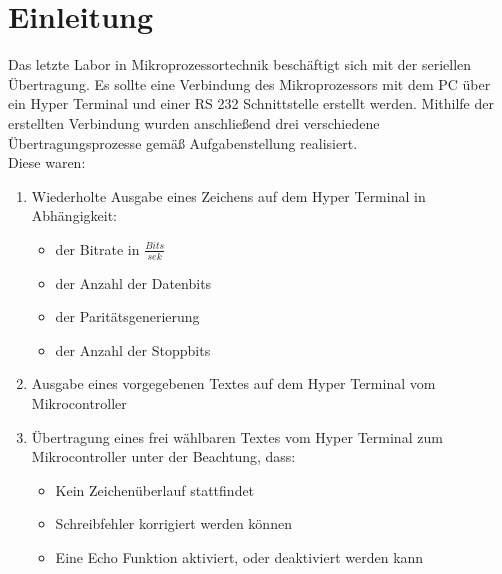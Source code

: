 %
%





\setlength{\parindent}{0pt}




\newpage
\listoftables
\listoffigures
\lstlistoflistings

\newpage

\tableofcontents
\newpage

	\section{Einleitung}
	
	Das letzte Labor in Mikroprozessortechnik beschäftigt sich mit der seriellen Übertragung. Es sollte eine Verbindung des Mikroprozessors mit dem PC über ein Hyper Terminal und einer RS 232 Schnittstelle erstellt werden. Mithilfe der erstellten Verbindung wurden anschließend drei verschiedene Übertragungsprozesse gemäß Aufgabenstellung realisiert.\\
	Diese waren:
	\begin{enumerate}
		\item Wiederholte Ausgabe eines Zeichens auf dem Hyper Terminal in Abhängigkeit:\label{Aufgabe 1} \begin{itemize}
			\item der Bitrate in $\frac{Bits}{sek}$
			\item der Anzahl der Datenbits
			\item der Paritätsgenerierung
			\item der Anzahl der Stoppbits
		\end{itemize}
	\item Ausgabe eines vorgegebenen Textes auf dem Hyper Terminal vom Mikrocontroller \label{Aufgabe 2}
	\item Übertragung eines frei wählbaren Textes vom Hyper Terminal zum \label{Aufgabe 3} Mikrocontroller unter der Beachtung, dass:\begin{itemize}
		\item Kein Zeichenüberlauf stattfindet 
		\item Schreibfehler korrigiert werden können
		\item Eine Echo Funktion aktiviert, oder deaktiviert werden kann
	\end{itemize}
	
	\end{enumerate}


